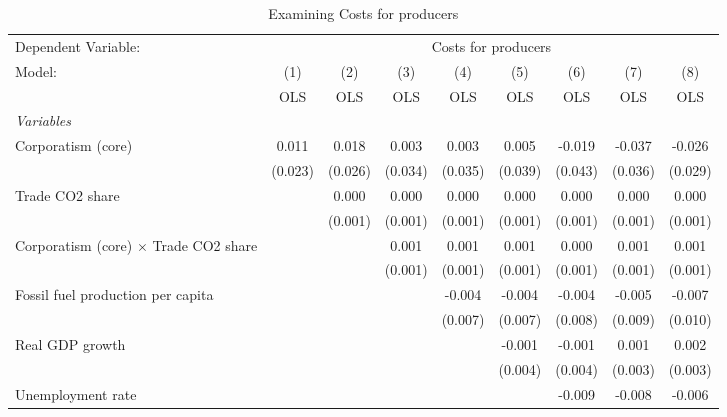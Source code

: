 
\begin{table}[htbp]
   \caption{Examining Costs for producers}
   \centering
   \begin{tabular}{lcccccccc}
      \toprule
      Dependent Variable: & \multicolumn{8}{c}{Costs for producers}\\
      Model:                                       & (1)     & (2)     & (3)     & (4)     & (5)     & (6)     & (7)     & (8)\\  
                                                   &  OLS    & OLS     & OLS     & OLS     & OLS     & OLS     & OLS     & OLS\\  
      \midrule
      \emph{Variables}\\
      Corporatism (core)                           & 0.011   & 0.018   & 0.003   & 0.003   & 0.005   & -0.019  & -0.037  & -0.026\\   
                                                   & (0.023) & (0.026) & (0.034) & (0.035) & (0.039) & (0.043) & (0.036) & (0.029)\\   
      Trade CO2 share                              &         & 0.000   & 0.000   & 0.000   & 0.000   & 0.000   & 0.000   & 0.000\\   
                                                   &         & (0.001) & (0.001) & (0.001) & (0.001) & (0.001) & (0.001) & (0.001)\\   
      Corporatism (core) $\times$ Trade CO2 share  &         &         & 0.001   & 0.001   & 0.001   & 0.000   & 0.001   & 0.001\\   
                                                   &         &         & (0.001) & (0.001) & (0.001) & (0.001) & (0.001) & (0.001)\\   
      Fossil fuel production per capita            &         &         &         & -0.004  & -0.004  & -0.004  & -0.005  & -0.007\\   
                                                   &         &         &         & (0.007) & (0.007) & (0.008) & (0.009) & (0.010)\\   
      Real GDP growth                              &         &         &         &         & -0.001  & -0.001  & 0.001   & 0.002\\   
                                                   &         &         &         &         & (0.004) & (0.004) & (0.003) & (0.003)\\   
      Unemployment rate                            &         &         &         &         &         & -0.009  & -0.008  & -0.006\\   

\end{tabular}
\end{table}

